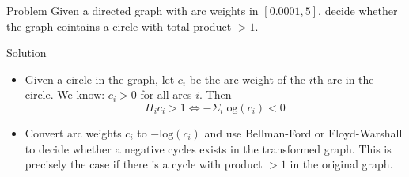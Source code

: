 \begin{slide}
    \begin{block}{Problem}
        Given a directed graph with arc weights in $[0.0001, 5]$, 
        decide whether the graph cointains a circle with total product 
        $> 1$. 
    \end{block}
    \begin{block}{Solution}
        \begin{itemize}
        	\item Given a circle in the graph, let $c_i$ be
        	      the arc weight of the $i$th arc in the circle.
        	      We know:  $c_i > 0$ for all arcs $i$.
        		  Then 
        	      $$\Pi_i c_i > 1 \Longleftrightarrow -\Sigma_i \text{log}(c_i) < 0$$
        	\item Convert arc weights $c_i$ to $-\text{log}(c_i)$ and use Bellman-Ford or Floyd-Warshall to decide whether a 
        	negative cycles exists in the transformed graph. This is precisely the case if there is a cycle with product $>1$ in the original graph.
        \end{itemize}
    \end{block}
\end{slide}
